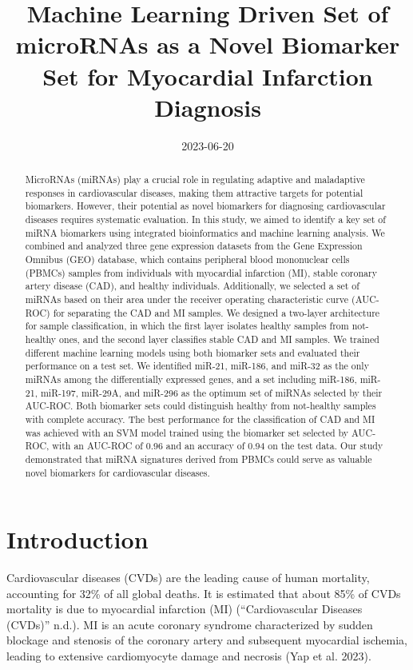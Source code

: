 \documentclass[
]{article}
\title{Machine Learning Driven Set of microRNAs as a Novel Biomarker Set
for Myocardial Infarction Diagnosis}
\author{}
\date{\vspace{-2.5em}2023-06-20}
\begin{document}
\maketitle
\begin{abstract}
MicroRNAs (miRNAs) play a crucial role in regulating adaptive and
maladaptive responses in cardiovascular diseases, making them attractive
targets for potential biomarkers. However, their potential as novel
biomarkers for diagnosing cardiovascular diseases requires systematic
evaluation. In this study, we aimed to identify a key set of miRNA
biomarkers using integrated bioinformatics and machine learning
analysis. We combined and analyzed three gene expression datasets from
the Gene Expression Omnibus (GEO) database, which contains peripheral
blood mononuclear cells (PBMCs) samples from individuals with myocardial
infarction (MI), stable coronary artery disease (CAD), and healthy
individuals. Additionally, we selected a set of miRNAs based on their
area under the receiver operating characteristic curve (AUC-ROC) for
separating the CAD and MI samples. We designed a two-layer architecture
for sample classification, in which the first layer isolates healthy
samples from not-healthy ones, and the second layer classifies stable
CAD and MI samples. We trained different machine learning models using
both biomarker sets and evaluated their performance on a test set. We
identified miR-21, miR-186, and miR-32 as the only miRNAs among the
differentially expressed genes, and a set including miR-186, miR-21,
miR-197, miR-29A, and miR-296 as the optimum set of miRNAs selected by
their AUC-ROC. Both biomarker sets could distinguish healthy from
not-healthy samples with complete accuracy. The best performance for the
classification of CAD and MI was achieved with an SVM model trained
using the biomarker set selected by AUC-ROC, with an AUC-ROC of 0.96 and
an accuracy of 0.94 on the test data. Our study demonstrated that miRNA
signatures derived from PBMCs could serve as valuable novel biomarkers
for cardiovascular diseases.
\end{abstract}

\hypertarget{introduction}{%
\section{Introduction}\label{introduction}}

Cardiovascular diseases (CVDs) are the leading cause of human mortality,
accounting for 32\% of all global deaths. It is estimated that about
85\% of CVDs mortality is due to myocardial infarction (MI)
({``Cardiovascular Diseases ({CVDs})''} n.d.). MI is an acute coronary
syndrome characterized by sudden blockage and stenosis of the coronary
artery and subsequent myocardial ischemia, leading to extensive
cardiomyocyte damage and necrosis (Yap et al. 2023).
\end{document}
